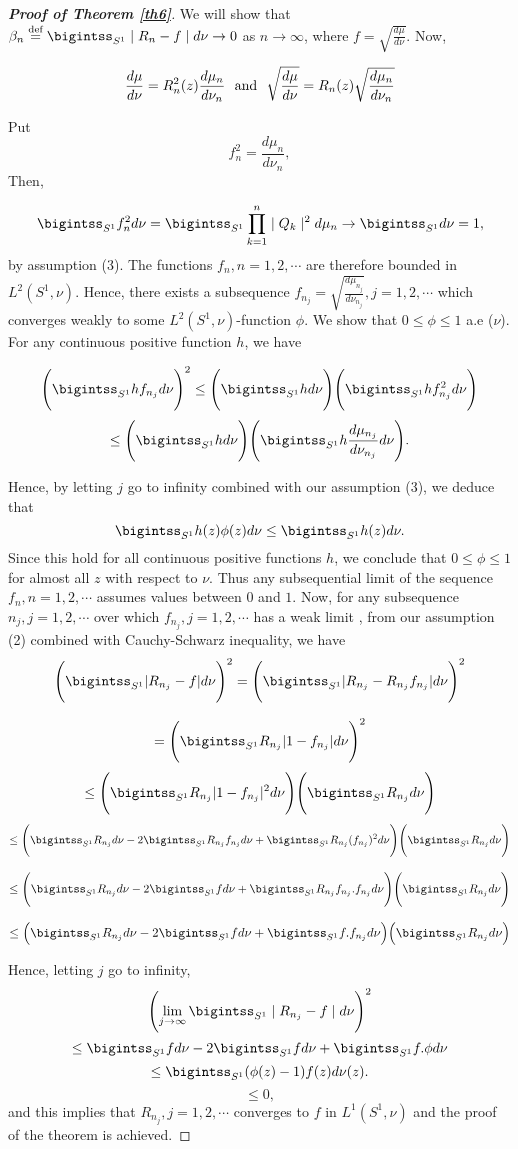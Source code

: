\documentclass{amsart}
\theoremstyle{definition}
\theoremstyle{remark}
\numberwithin{equation}{section}
\newcommand{\1}{\mathbb{1}}
\begin{document}
\begin{proof}[\bf {Proof of Theorem \ref{th6}}] We will show that
    $\beta_n \stackrel{\textrm {def}}{=} \bigintss_{S^1} \mid R_n-f\mid d\nu \rightarrow 0$ as $n \rightarrow \infty$,
where $f=\sqrt{\frac{d\mu}{d\nu}}$. Now,

$$\frac{d\mu}{d\nu}=R_n^2(z)\frac{d\mu_n}{d\nu_n}~~ {\rm{and}}~~  \sqrt{\frac{d\mu}{d\nu}}=R_n(z)\sqrt{\frac{d\mu_n}{d\nu_n}}$$

\noindent{}Put $$f^2_n =\frac{d\mu_n}{d\nu_n},$$ Then,

 $$\bigintss_{S^1}f_n^2d\nu  = \bigintss_{S^1}\prod_{k=1}^n\mid Q_k\mid^2d\mu_n \rightarrow \bigintss_{S^1}d\nu =1,$$
by assumption (3). The functions $f_n, n=1,2,\cdots$ are therefore bounded in $L^2(S^1, \nu)$.
 Hence, there exists a subsequence
$f_{n_j} = \sqrt{\frac{d\mu_{n_j}}{d\nu_{n_j}}}, j = 1,2, \cdots$ which converges weakly to some $L^2(S^1, \nu)$-function $\phi$. We show that $0 \leq \phi \leq 1$ a.e ($\nu$). For any continuous positive function $h$, we have

$$\Biggl(\bigintss_{S^1} h f_{n_j} d\nu\Biggr)^2 \leq \Biggl(\bigintss_{S^1} h d\nu\Biggr) \Biggl(\bigintss_{S^1} h f_{n_j}^2 d\nu\Biggr)$$
$$\leq \Biggl(\bigintss_{S^1} h d\nu\Biggr) \Biggl(\bigintss_{S^1} h \frac{d\mu_{n_j}}{d\nu_{n_j}}d\nu\Biggr).$$

\noindent{} Hence, by letting $j$ go to infinity combined with our assumption (3), we deduce that
$$ \bigintss_{S^1} h(z) \phi(z) d\nu \leq  \bigintss_{S^1} h(z) d\nu.$$
Since this hold for all continuous positive functions $h$, we conclude that $0 \leq \phi \leq 1$ for almost all $z$ with respect to $\nu$. Thus any subsequential limit of the sequence $f_n, n=1,2,\cdots$ assumes values between $0$ and $1$.
Now, for any subsequence $n_j, j =1,2,\cdots$ over which $f_{n_j}, j=1,2,\cdots$ has a weak limit , from our assumption (2) combined with Cauchy-Schwarz inequality, we have
$$
 \Biggl(\bigintss_{S^1}|R_{n_j}-f| d\nu\Biggr)^2=\Biggl(\bigintss_{S^1} |R_{n_j}-R_{n_j} f_{n_j}| d\nu\Biggr)^2$$

$$=\Biggl(\bigintss_{S^1} R_{n_j}|1-f_{n_j}| d\nu\Biggr)^2 $$
$$\leq \Biggl(\bigintss_{S^1} R_{n_j}|1-f_{n_j}|^2 d\nu\Biggr) \Biggl(\bigintss_{S^1} R_{n_j} d\nu \Biggr)$$
$$\leq \Biggl(\bigintss_{S^1} R_{n_j} d\nu-2\bigintss_{S^1} R_{n_j}f_{n_j}d\nu+\bigintss_{S^1} R_{n_j}(f_{n_j})^2 d\nu\Biggr)\Biggl(\bigintss_{S^1}R_{n_j}d\nu\Biggr)$$

$$\leq \Biggl(\bigintss_{S^1} R_{n_j} d\nu-2 \bigintss_{S^{1}} f d\nu+\bigintss_{S^1} R_{n_j}f_{n_j}. f_{n_j}  d\nu\Biggr)\Biggl(\bigintss_{S^1}R_{n_j}d\nu\Biggr)$$

$$\leq \Bigl(\bigintss_{S^1} R_{n_j} d\nu-2 \bigintss_{S^1} f d\nu+\bigintss_{S^{1}} f. f_{n_j}  d\nu\Bigr)\Bigl(\bigintss_{S^1}R_{n_j}d\nu\Bigr)$$

\noindent{}Hence, letting $j$ go to infinity,
$$\Biggl(\lim_{j \rightarrow \infty}\bigintss_{S^1}\mid R_{n_j}-f\mid d\nu\Biggr)^2$$
$$\leq \bigintss_{S^1} f d\nu-2 \bigintss_{S^1} f d\nu+\bigintss_{S^1} f. \phi  d\nu$$
$$\leq \bigintss_{S^1}(\phi(z)-1)f(z) d\nu(z).$$
  $$\leq 0,$$
\noindent{}and this implies that $R_{n_j}, j =1,2,\cdots $  converges to $ f$ in $L^1(S^1, \nu)$  and the proof of the theorem is achieved.
\end{proof}
\end{document}
